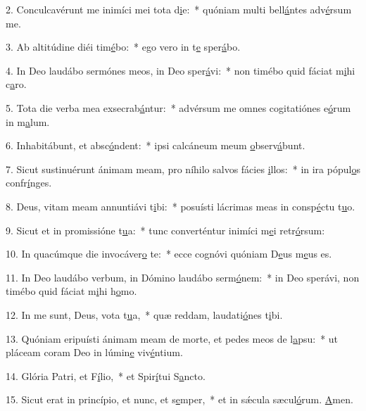 2. Conculcavérunt me inimíci mei tota d\uline{i}e:~* quóniam multi bell\uline{á}ntes adv\uline{é}rsum me.\par 
3. Ab altitúdine diéi tim\uline{é}bo:~* ego vero in t\uline{e} sper\uline{á}bo.\par 
4. In Deo laudábo sermónes meos, in Deo sper\uline{á}vi:~* non timébo quid fáciat m\uline{i}hi c\uline{a}ro.\par 
5. Tota die verba mea exsecrab\uline{á}ntur:~* advérsum me omnes cogitatiónes e\uline{ó}rum in m\uline{a}lum.\par 
6. Inhabitábunt, et absc\uline{ó}ndent:~* ipsi calcáneum meum \uline{o}bserv\uline{á}bunt.\par 
7. Sicut sustinuérunt ánimam meam, pro níhilo salvos fácies \uline{i}llos:~* in ira pópul\uline{o}s confr\uline{í}nges.\par 
8. Deus, vitam meam annuntiávi t\uline{i}bi:~* posuísti lácrimas meas in consp\uline{é}ctu t\uline{u}o.\par 
9. Sicut et in promissióne t\uline{u}a:~* tunc converténtur inimíci m\uline{e}i retr\uline{ó}rsum:\par 
10. In quacúmque die invocáver\uline{o} te:~* ecce cognóvi quóniam D\uline{e}us m\uline{e}us es.\par 
11. In Deo laudábo verbum, in Dómino laudábo serm\uline{ó}nem:~* in Deo sperávi, non timébo quid fáciat m\uline{i}hi h\uline{o}mo.\par 
12. In me sunt, Deus, vota t\uline{u}a,~* quæ reddam, laudati\uline{ó}nes t\uline{i}bi.\par 
13. Quóniam eripuísti ánimam meam de morte, et pedes meos de l\uline{a}psu:~* ut pláceam coram Deo in lúmin\uline{e} viv\uline{é}ntium.\par 
14. Glória Patri, et F\uline{í}lio,~* et Spir\uline{í}tui S\uline{a}ncto.\par 
15. Sicut erat in princípio, et nunc, et s\uline{e}mper,~* et in sǽcula sæcul\uline{ó}rum. \uline{A}men.\par 
